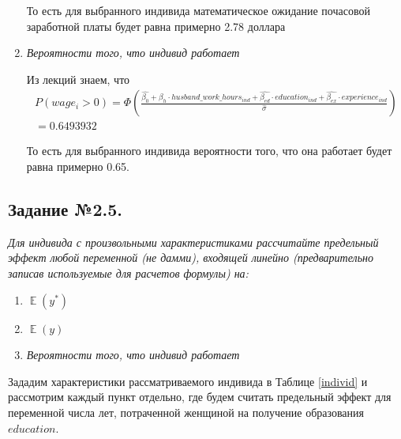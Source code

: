 \documentclass[a4paper,12pt]{article}
\DeclareMathOperator{\EX}{\mathbb{E}}%
\begin{document}
\begin{enumerate}[label=\Alph*)]
	То есть для выбранного индивида математическое ожидание почасовой заработной платы будет равна примерно 2.78 доллара
	
	\item \textit{Вероятности того, что индивид работает}
	
	Из лекций знаем, что 
	\begin{align*}
			P(wage_i>0) = \Phi \left(\frac{\hat{\beta_0}+\hat{\beta_h} \cdot husband\_work\_hours_{ind}  +\hat{\beta_{ed} }\cdot education_{ind}+ \hat{\beta_{ex} }\cdot experience_{ind} }{\hat{\sigma} }\right) \\= 0.6493932
	\end{align*}
	
	То есть для выбранного индивида вероятности того, что она работает будет равна примерно 0.65.
	
\end{enumerate}


\subsection{Задание №2.5.}
\textit{
Для индивида с произвольными характеристиками рассчитайте предельный
эффект любой переменной (не дамми), входящей линейно (предварительно записав
используемые для расчетов формулы) на:}

\begin{enumerate}[label=\Alph*)]
	\item $\EX(y^*)$
	\item $\EX(y)$
	\item \textit{Вероятности того, что индивид работает}
\end{enumerate}

Зададим характеристики рассматриваемого индивида в Таблице \ref{individ} и рассмотрим каждый пункт отдельно, где будем считать предельный эффект для переменной числа лет, потраченной женщиной на получение образования $education$.
\end{document}
